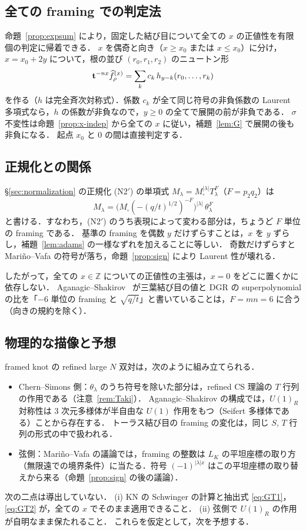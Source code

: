 \subsection{全ての framing での判定法}\label{sec:newton}
命題~\ref{prop:expsum} により，固定した結び目について全ての $x$ の正値性を有限個の判定に帰着できる．
$x$ を偶奇と向き（$x\ge x_0$ または $x\le x_0$）に分け，$x=x_0+2y$ について，根の並び $(r_0,r_1,r_2)$ のニュートン形
\[
\mathbf{t}^{-nx}\widehat{f}^{(x)}_\rho=\sum_{k}c_k\,h_{y-k}(r_0,\dots,r_k)
\]
を作る（$h$ は完全斉次対称式）．係数 $c_k$ が全て同じ符号の非負係数の Laurent 多項式なら，$h$ の係数が非負なので，$y\ge0$ の全てで展開の前が非負である．
$\sigma$ 不変性は命題~\ref{prop:x-indep} から全ての $x$ に従い，補題~\ref{lem:G} で展開の後も非負になる．
起点 $x_0$ と 0 の間は直接判定する．

\subsection{正規化との関係}\label{sec:N2-framing}
\begin{proposition}\label{prop:N2-framing}
\S\ref{sec:normalization} の正規化 (N2$'$) の単項式 $M_\lambda=M_\square^{|\lambda|}T_\lambda^F$（$F=p_2q_2$）は
\[
M_\lambda=\bigl(M_\square(-(q/t)^{1/2})^{-F}\bigr)^{|\lambda|}\,\theta_\lambda^F
\]
と書ける．すなわち，(N2$'$) のうち表現によって変わる部分は，ちょうど $F$ 単位の framing である．
基準の framing を偶数 $y$ だけずらすことは，$x$ を $y$ ずらし，補題~\ref{lem:adams} の一様なずれを加えることに等しい．
奇数だけずらすと Mariño--Vafa の符号が落ち，命題~\ref{prop:sign} により Laurent 性が壊れる．
\end{proposition}
したがって，全ての $x\in\mathbb{Z}$ についての正値性の主張は，$x=0$ をどこに置くかに依存しない．
Aganagic--Shakirov~\cite{Aganagic11} が三葉結び目の値と DGR の superpolynomial の比を「$-6$ 単位の framing と $\sqrt{q/t}$」と書いていることは，$F=mn=6$ に合う（向きの規約を除く）．

\subsection{物理的な描像と予想}\label{sec:physics}
framed knot の refined large $N$ 双対は，次のように組み立てられる．
\begin{itemize}
\item Chern--Simons 側：$\theta_\lambda$ のうち符号を除いた部分は，refined CS 理論の $T$ 行列の作用である（注意~\ref{rem:Taki}）．
Aganagic--Shakirov の構成では，$U(1)_R$ 対称性は 3 次元多様体が半自由な $U(1)$ 作用をもつ（Seifert 多様体である）ことから存在する．
トーラス結び目の framing の変化は，同じ $S$, $T$ 行列の形式の中で扱われる．
\item 弦側：Mariño--Vafa の議論では，framing の整数は $L_K$ の平坦座標の取り方（無限遠での境界条件）に当たる．符号 $(-1)^{|\lambda|x}$ はこの平坦座標の取り替えから来る（命題~\ref{prop:sign} の後の議論）．
\end{itemize}
次の二点は導出していない．
(i) KN の Schwinger の計算と抽出式 \eqref{eq:GT1}，\eqref{eq:GT2} が，全ての $x$ でそのまま適用できること．
(ii) 弦側で $U(1)_R$ の作用が自明なまま保たれること．
これらを仮定として，次を予想する．


